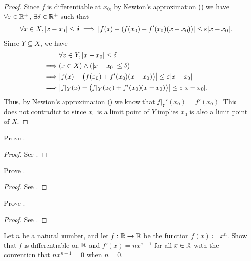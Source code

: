 \begin{proof}
  Since \(f\) is differentiable at \(x_0\), by Newton's approximation () we have \(\forall \varepsilon \in \mathbb{R}^+\), \(\exists \delta \in \mathbb{R}^+\) such that
  \[
    \forall x \in X, \abs{x - x_0} \leq \delta \implies \abs{f(x) - (f(x_0) + f'(x_0)(x - x_0))} \leq \varepsilon \abs{x - x_0}.
  \]
  Since \(Y \subseteq X\), we have
  \begin{align*}
             & \forall x \in Y, \abs{x - x_0} \leq \delta                                             \\
    \implies & (x \in X) \land (\abs{x - x_0} \leq \delta)                                            \\
    \implies & \abs{f(x) - \big(f(x_0) + f'(x_0)(x - x_0)\big)} \leq \varepsilon \abs{x - x_0}        \\
    \implies & \abs{f|_Y(x) - \big(f|_Y(x_0) + f'(x_0)(x - x_0)\big)} \leq \varepsilon \abs{x - x_0}.
  \end{align*}
  Thus, by Newton's approximation () we know that \(f|_Y'(x_0) = f'(x_0)\).
  This does not contradict to  since \(x_0\) is a limit point of \(Y\) implies \(x_0\) is also a limit point of \(X\).
\end{proof}

\begin{ex}\label{i:ex:10.1.2}
  Prove .
\end{ex}

\begin{proof}
  See .
\end{proof}

\begin{ex}\label{i:ex:10.1.3}
  Prove .
\end{ex}

\begin{proof}
  See .
\end{proof}

\begin{ex}\label{i:ex:10.1.4}
  Prove .
\end{ex}

\begin{proof}
  See .
\end{proof}

\begin{ex}\label{i:ex:10.1.5}
  Let \(n\) be a natural number, and let \(f : \mathbb{R} \to \mathbb{R}\) be the function \(f(x) \coloneqq x^n\).
  Show that \(f\) is differentiable on \(\mathbb{R}\) and \(f'(x) = n x^{n - 1}\) for all \(x \in \mathbb{R}\) with the convention that \(n x^{n - 1} = 0\) when \(n = 0\).
\end{ex}

